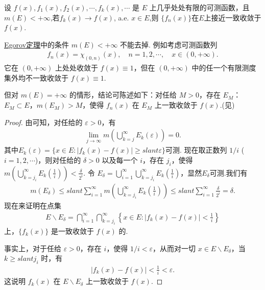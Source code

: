 \documentclass[../../main.tex]{subfiles}
\begin{document}
\begin{theorem}\label{theorem:Egorov定理}
设 $f(x),f_1(x),f_2(x),\cdots,f_k(x),\cdots$ 是 $E$ 上几乎处处有限的可测函数，且 $m(E)<+\infty$,若$f_k(x)\to f(x)$, a.e. $x\in E$,则
$\{f_n(x)\}$在$E$上接近一致收敛于$f(x)$.
\end{theorem}
\begin{remark}
\hyperref[theorem:Egorov定理]{Egorov定理}中的条件 $m(E)<+\infty$ 不能去掉. 例如考虑可测函数列
\begin{align*}
f_n(x)=\chi_{(0,n)}(x),\quad n = 1,2,\cdots,\quad x\in(0,+\infty).
\end{align*}
它在 $(0,+\infty)$ 上处处收敛于 $f(x)\equiv1$，但在 $(0,+\infty)$ 中的任一个有限测度集外均不一致收敛于 $f(x)\equiv1$.

但对 $m(E)=+\infty$ 的情形，结论可陈述如下：对任给 $M>0$，存在 $E_M$：$E_M\subset E$，$m(E_M)>M$，使得 $f_n(x)$ 在 $E_M$ 上一致收敛于 $f(x)$.(见)
\end{remark}
\begin{proof}
由可知，对任给的 $\varepsilon>0$，有
\begin{align*}
\lim_{j\to\infty}m\left(\bigcup_{k = j}^{\infty}E_k(\varepsilon)\right)=0.
\end{align*}
其中$E_k(\varepsilon) = \{x \in E: |f_k(x) - f(x)| \geqslant slant \varepsilon\}$可测.
现在取正数列 $1/i$ ($i = 1,2,\cdots$)，则对任给的 $\delta>0$ 以及每一个 $i$，存在 $j_i$，使得 $m\left(\bigcup_{k = j_i}^{\infty}E_k\left(\frac{1}{i}\right)\right)<\frac{\delta}{2^i}$. 令 $E_\delta=\bigcup_{i = 1}^{\infty}\bigcup_{k = j_i}^{\infty}E_k\left(\frac{1}{i}\right)$，显然$E_\delta$可测.我们有
\begin{align*}
m(E_\delta)\leqslant slant\sum_{i = 1}^{\infty}m\left(\bigcup_{k = j_i}^{\infty}E_k\left(\frac{1}{i}\right)\right)\leqslant slant\sum_{i = 1}^{\infty}\frac{\delta}{2^i}=\delta.
\end{align*}
现在来证明在点集
\begin{align*}
E\backslash E_\delta=\bigcap_{i = 1}^{\infty}\bigcap_{k = j_i}^{\infty}\left\{x\in E:\vert f_k(x)-f(x)\vert<\frac{1}{i}\right\}
\end{align*}
上，$\{f_k(x)\}$ 是一致收敛于 $f(x)$ 的.

事实上，对于任给 $\varepsilon>0$，存在 $i$，使得 $1/i<\varepsilon$，从而对一切 $x\in E\backslash E_\delta$，当 $k\geqslant slant j_i$ 时，有
\begin{align*}
\vert f_k(x)-f(x)\vert<\frac{1}{i}<\varepsilon.
\end{align*}
这说明 $f_k(x)$ 在 $E\backslash E_\delta$ 上一致收敛于 $f(x)$. 
\end{proof}
\end{document}
